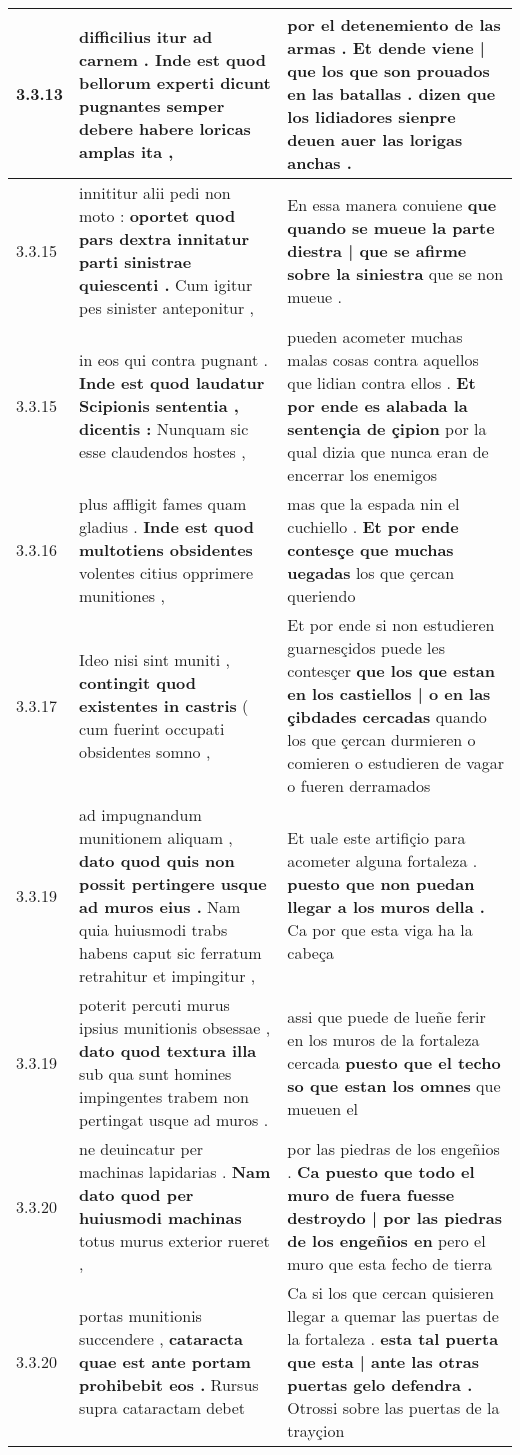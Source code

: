 \begin{tabular}{|p{1cm}|p{6.5cm}|p{6.5cm}|}
3.3.13 & difficilius itur ad carnem . \textbf{ Inde est quod bellorum experti dicunt pugnantes } semper debere habere loricas amplas ita , & por el detenemiento de las armas . \textbf{ Et dende viene | que los que son prouados en las batallas . } dizen que los lidiadores sienpre deuen auer las lorigas anchas . \\\hline
3.3.15 & innititur alii pedi non moto : \textbf{ oportet quod pars dextra innitatur parti sinistrae quiescenti . } Cum igitur pes sinister anteponitur , & En essa manera conuiene \textbf{ que quando se mueue la parte diestra | que se afirme sobre la siniestra } que se non mueue . \\\hline
3.3.15 & in eos qui contra pugnant . \textbf{ Inde est quod laudatur Scipionis sententia , dicentis : } Nunquam sic esse claudendos hostes , & pueden acometer muchas malas cosas contra aquellos que lidian contra ellos . \textbf{ Et por ende es alabada la sentençia de çipion } por la qual dizia que nunca eran de encerrar los enemigos \\\hline
3.3.16 & plus affligit fames quam gladius . \textbf{ Inde est quod multotiens obsidentes } volentes citius opprimere munitiones , & mas que la espada nin el cuchiello . \textbf{ Et por ende contesçe que muchas uegadas } los que çercan queriendo \\\hline
3.3.17 & Ideo nisi sint muniti , \textbf{ contingit quod existentes in castris } ( cum fuerint occupati obsidentes somno , & Et por ende si non estudieren guarnesçidos puede les contesçer \textbf{ que los que estan en los castiellos | o en las çibdades cercadas } quando los que çercan durmieren o comieren o estudieren de vagar o fueren derramados \\\hline
3.3.19 & ad impugnandum munitionem aliquam , \textbf{ dato quod quis non possit pertingere usque ad muros eius . } Nam quia huiusmodi trabs habens caput sic ferratum retrahitur et impingitur , & Et uale este artifiçio para acometer alguna fortaleza . \textbf{ puesto que non puedan llegar a los muros della . } Ca por que esta viga ha la cabeça \\\hline
3.3.19 & poterit percuti murus ipsius munitionis obsessae , \textbf{ dato quod textura illa } sub qua sunt homines impingentes trabem non pertingat usque ad muros . & assi que puede de lueñe ferir en los muros de la fortaleza cercada \textbf{ puesto que el techo so que estan los omnes } que mueuen el \\\hline
3.3.20 & ne deuincatur per machinas lapidarias . \textbf{ Nam dato quod per huiusmodi machinas } totus murus exterior rueret , & por las piedras de los engeñios . \textbf{ Ca puesto que todo el muro de fuera fuesse destroydo | por las piedras de los engeñios en } pero el muro que esta fecho de tierra \\\hline
3.3.20 & portas munitionis succendere , \textbf{ cataracta quae est ante portam prohibebit eos . } Rursus supra cataractam debet & Ca si los que cercan quisieren llegar a quemar las puertas de la fortaleza . \textbf{ esta tal puerta que esta | ante las otras puertas gelo defendra . } Otrossi sobre las puertas de la trayçion \\\hline

\end{tabular}
